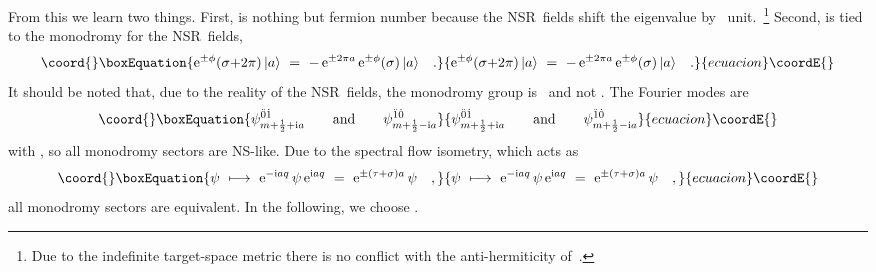 \documentclass[a4paper,11pt]{article}
\def\s{\sigma}
\def\t{\tau}
\def\j{\psi}
\providecommand{\R}{\mathbb R}
\providecommand{\Z}{\mathbb Z}
\def\e{\textrm{e}}
\def\i{\textrm{i}}
\def\zd{{\dot{0}}}
\def\od{{\dot{1}}}
\def\zdd{{\ddot{0}}}
\def\odd{{\ddot{1}}}
\begin{document}
{}From this we learn two things.
First, \myHighlight{$\i p$}\coordHE{} is nothing but fermion number because
the NSR~fields \myHighlight{$\e^{\pm\phi}$}\coordHE{} shift the eigenvalue by~\coordHE{} unit.~\footnote{
Due to the indefinite target-space metric there is no conflict with the
anti-hermiticity of~\myHighlight{$\i p$}\coordHE{}.}
Second, \coordHE{} is tied to the monodromy for the NSR~fields,
\begin{equation}\coord{}\boxEquation{
\e^{\pm\phi}(\s{+}2\pi)\,|a\rangle\ =\ 
-\,\e^{\pm 2\pi a}\,\e^{\pm\phi}(\s)\,|a\rangle \quad.
}{
\e^{\pm\phi}(\s{+}2\pi)\,|a\rangle\ =\ 
-\,\e^{\pm 2\pi a}\,\e^{\pm\phi}(\s)\,|a\rangle \quad.
}{ecuacion}\coordE{}\end{equation}
It should be noted that, due to the reality of the NSR~fields, the monodromy
group is~\myHighlight{$\R_+$}\coordHE{} and not \coordHE{}. The Fourier modes are
\begin{equation}\coord{}\boxEquation{
\j^{\zdd\od}_{m+\frac12+\i a}
\qquad\textrm{and}\qquad
\j^{\odd\zd}_{m+\frac12-\i a}
}{
\j^{\zdd\od}_{m+\frac12+\i a}
\qquad\textrm{and}\qquad
\j^{\odd\zd}_{m+\frac12-\i a}
}{ecuacion}\coordE{}\end{equation}
with \myHighlight{$m\in\Z$}\coordHE{}, so all monodromy sectors are NS-like. 
Due to the spectral flow isometry, which acts as
\begin{equation}\coord{}\boxEquation{
\j\ \longmapsto\ \e^{-\i a q}\,\j\,\e^{\i a q}\ =\ \e^{\pm(\t+\s)a}\,\j \quad,
}{
\j\ \longmapsto\ \e^{-\i a q}\,\j\,\e^{\i a q}\ =\ \e^{\pm(\t+\s)a}\,\j \quad,
}{ecuacion}\coordE{}\end{equation}
all monodromy sectors are equivalent. In the following, we choose \coordHE{}.
\\
\end{document}
